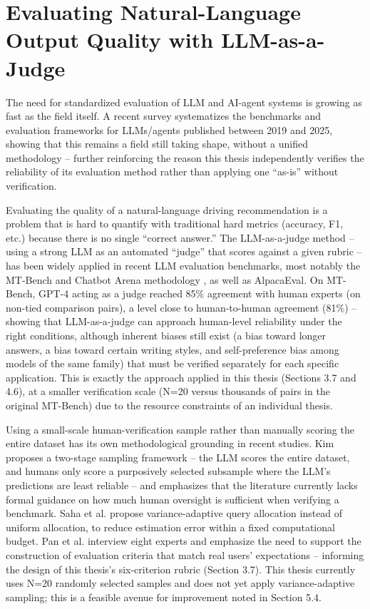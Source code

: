 \documentclass[12pt,a4paper]{report}
\begin{document}
\section{Evaluating Natural-Language Output Quality with LLM-as-a-Judge}

The need for standardized evaluation of LLM and AI-agent systems is growing as fast as the field itself. A recent survey \cite{ferrag2025review} systematizes the benchmarks and evaluation frameworks for LLMs/agents published between 2019 and 2025, showing that this remains a field still taking shape, without a unified methodology -- further reinforcing the reason this thesis independently verifies the reliability of its evaluation method rather than applying one ``as-is'' without verification.

Evaluating the quality of a natural-language driving recommendation is a problem that is hard to quantify with traditional hard metrics (accuracy, F1, etc.) because there is no single ``correct answer.'' The LLM-as-a-judge method -- using a strong LLM as an automated ``judge'' that scores against a given rubric -- has been widely applied in recent LLM evaluation benchmarks, most notably the MT-Bench and Chatbot Arena methodology \cite{zheng2023mtbench}, as well as AlpacaEval. On MT-Bench, GPT-4 acting as a judge reached 85\% agreement with human experts (on non-tied comparison pairs), a level close to human-to-human agreement (81\%) -- showing that LLM-as-a-judge can approach human-level reliability under the right conditions, although inherent biases still exist (a bias toward longer answers, a bias toward certain writing styles, and self-preference bias among models of the same family) that must be verified separately for each specific application. This is exactly the approach applied in this thesis (Sections 3.7 and 4.6), at a smaller verification scale (N=20 versus thousands of pairs in the original MT-Bench) due to the resource constraints of an individual thesis.

Using a small-scale human-verification sample rather than manually scoring the entire dataset has its own methodological grounding in recent studies. Kim \cite{kim2026augmenting} proposes a two-stage sampling framework -- the LLM scores the entire dataset, and humans only score a purposively selected subsample where the LLM's predictions are least reliable -- and emphasizes that the literature currently lacks formal guidance on how much human oversight is sufficient when verifying a benchmark. Saha et al. \cite{saha2026budget} propose variance-adaptive query allocation instead of uniform allocation, to reduce estimation error within a fixed computational budget. Pan et al. \cite{pan2024human} interview eight experts and emphasize the need to support the construction of evaluation criteria that match real users' expectations -- informing the design of this thesis's six-criterion rubric (Section 3.7). This thesis currently uses N=20 randomly selected samples and does not yet apply variance-adaptive sampling; this is a feasible avenue for improvement noted in Section 5.4.
\end{document}
